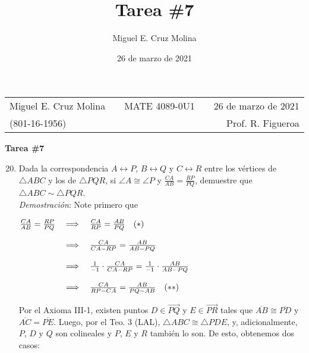 \documentclass[12pt]{article}
\title{Tarea \#7}
\date{26 de marzo de 2021}
\author{Miguel E. Cruz Molina}
\begin{document}
\begin{tabularx}{.95\textwidth}{lXcXr}
	Miguel E. Cruz Molina && MATE 4089-0U1 && 26 de marzo de 2021\\[.15in]
	(801-16-1956) &&  && Prof. R. Figueroa\\[.15in]
\end{tabularx}

\begin{center}
	\textbf{Tarea \#7}
\end{center}

\begin{enumerate}

\setcounter{enumi}{19}


\item Dada la correspondencia $A \leftrightarrow P$, $B \leftrightarrow Q$ y $C \leftrightarrow R$ entre los vértices de $\bigtriangleup ABC$ y los de $\bigtriangleup PQR$, si $\angle A \cong \angle P$ y $\frac{CA}{AB} = \frac{RP}{PQ}$, demuestre que $\bigtriangleup ABC \sim \bigtriangleup PQR$. \\

{\it Demostración}: Note primero que

\begin{center}
$\begin{array}{@{\hskip 0 in}lll}
\frac{CA}{AB} = \frac{RP}{PQ} & \implies & \frac{CA}{RP} = \frac{AB}{PQ} \quad (*) \\
& \\
					& \implies & \frac{CA}{CA-RP} = \frac{AB}{AB-PQ} \\
& \\
					& \implies & \frac{1}{-1}\cdot\frac{CA}{CA-RP} = \frac{1}{-1}\cdot\frac{AB}{AB-PQ} \\
& \\
					& \implies & \frac{CA}{RP-CA} = \frac{AB}{PQ-AB} \quad (**) \\
\end{array}$
\end{center}

Por el Axioma III-1, existen puntos $D \in \overrightarrow{PQ}$ y $E \in \overrightarrow{PR}$ tales que $\overline{AB} \cong \overline{PD}$ y $\overline{AC} = \overline{PE}$. Luego, por el Teo. 3 (LAL), $\bigtriangleup ABC \cong \bigtriangleup PDE$, y, adicionalmente, $P$, $D$ y $Q$ son colineales y $P$, $E$ y $R$ también lo son. De esto, obtenemos dos casos:

\begin{itemize}


\end{itemize}
\end{enumerate}
\end{document}
